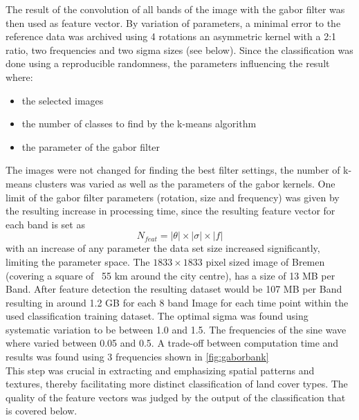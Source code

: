 \documentclass[12pt,a4paper, english,twoside]{article}
\begin{document}
 \noindent 
      The result of the convolution of all bands of the image with the gabor filter was then used as feature vector. 
      By variation of parameters, a minimal error to the reference data was archived using 4 rotations an asymmetric kernel with a 2:1 ratio, two frequencies and two sigma sizes (see below).
      Since the classification was done using a reproducible randomness, the parameters influencing the result where:
      \begin{itemize}
        \item the selected images
        \item the number of classes to find by the k-means algorithm
        \item the parameter of the gabor filter
      \end{itemize}
      The images were not changed for finding the best filter settings, the number of k-means clusters was varied as well as the parameters of the gabor kernels. 
      One limit of the gabor filter parameters (rotation, size and frequency) was given by the resulting increase in processing time, since the resulting feature vector for each band is set as  
      \begin{equation}
        N_{feat} = |\theta| \times |\sigma| \times |f| 
      \end{equation}
      with an increase of any parameter the data set size increased significantly, limiting the parameter space. 
    The $1833 \times 1833$ pixel sized image of Bremen (covering a square of ~55 km around the city centre), has a size of 13 MB per Band. 
    After feature detection the resulting dataset would be 107 MB per Band resulting in around 1.2 GB for each 8 band Image for each time point within the used classification training dataset. 
    The optimal sigma was found using systematic variation to be between 1.0 and 1.5. 
    The frequencies of the sine wave where varied between 0.05 and 0.5. 
    A trade-off between computation time and results was found using 3 frequencies shown in \cref{fig:gaborbank} \\ 
    This step was crucial in extracting and emphasizing spatial patterns and textures, thereby facilitating more distinct classification of land cover types.
      The quality of the feature vectors was judged by the output of the classification that is covered below. 
      \newpage
\end{document}
